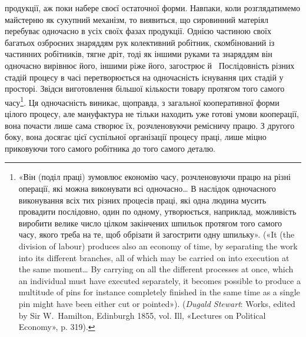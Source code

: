 \parcont{}  %
продукції, аж поки набере своєї остаточної форми. Навпаки, коли
розглядатимемо майстерню як сукупний механізм, то виявиться,
що сировинний матеріял перебуває одночасно в усіх своїх фазах
продукції. Однією частиною своїх багатьох озброєних знаряддям
рук колективний робітник, скомбінований із частинних робітників,
тягне дріт, тоді як іншими руками та знаряддям він одночасно
вирівнює його, іншими ріже його, загострює й~ Послідовність
різних стадій процесу в часі перетворюється на одночасність
існування цих стадій у просторі. Звідси виготовлення більшої
кількости товару протягом того самого часу\footnote{
«Він (поділ праці) зумовлює економію часу, розчленовуючи
працю на різні операції, які можна виконувати всі одночасно\dots{} В наслідок
одночасного виконування всіх тих різних процесів праці, які одна
людина мусить провадити послідовно, один по одному, утворюється,
наприклад, можливість виробити велике число цілком закінчених
шпильок протягом того самого часу, якого треба на те, щоб обрізати й
загострити одну шпильку». («It (the division of labour) produces also
an economy of time, by separating the work into its different branches, all
of which may be carried on into execution at the same moment\dots{} By carrying
on all the different processes at once, which an individual must have
executed separately, it becomes possible to produce a multitude of pins
for instance completely finished in the same time as a single pin might
have been either cut or pointed»). (\emph{Dugald Stewart}: Works, edited
by Sir W.~Hamilton, Edinburgh 1855, vol. Ill, «Lectures on Political
Economy», p. 319).
}. Ця одночасність
виникає, щоправда, з загальної кооперативної форми цілого
процесу, але мануфактура не тільки находить уже готові умови
кооперації, вона почасти лише сама створює їх, розчленовуючи
ремісничу працю. З другого боку, вона досягає цієї суспільної
організації процесу праці, лише міцно приковуючи того самого
робітника до того самого деталю.

